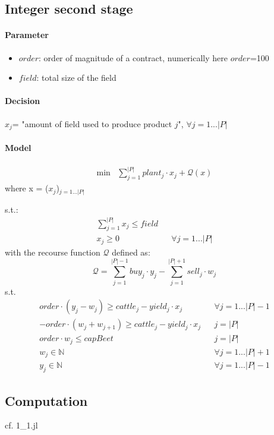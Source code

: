 \documentclass[12pt]{article}
\begin{document}
\subsection{Integer second stage}
\setcounter{equation}{0}
\paragraph{Parameter}
\begin{itemize}
	\item $order$: order of magnitude of a contract, numerically here $order$=100
	\item $field$: total size of the field
\end{itemize}
\paragraph{Decision}
$x_j$= "amount of field used to produce product $j$", $\forall j=1...|P|$
\paragraph{Model}
\begin{align}
	\text{min} & \sum\limits_{j=1}^{|P|} plant_j \cdot x_j + \mathcal{Q}(x)
\end{align}
where x = ($x_j$)$_{j = 1...|P|}$

s.t.:
\begin{align}
\sum\limits_{j=1}^{|P|} x_j\leq field & & \\
x_j \geq 0 & & \forall j=1...|P|
\end{align}
with the recourse function $\mathcal{Q}$ defined as:\\
\begin{equation}
\mathcal{Q} = \sum\limits_{j=1}^{|P|-1} buy_j \cdot y_j - \sum\limits_{j=1}^{|P|+1} sell_j \cdot w_j
\end{equation}
s.t.\\
\begin{align}
order \cdot (y_j - w_j) \geq cattle_j - yield_j \cdot x_j &  & \forall j=1...|P|-1\\
- order \cdot (w_j + w_{j+1}) \geq cattle_j - yield_j \cdot x_j & & j=|P|\\
order \cdot w_{j} \leq capBeet & & j=|P|\\
w_j \in \mathbb{N} & & \forall j=1...|P|+1\\
y_j \in \mathbb{N} & & \forall j=1...|P|-1
\end{align}

\subsection{Computation}
cf. 1\_1.jl
\end{document}
